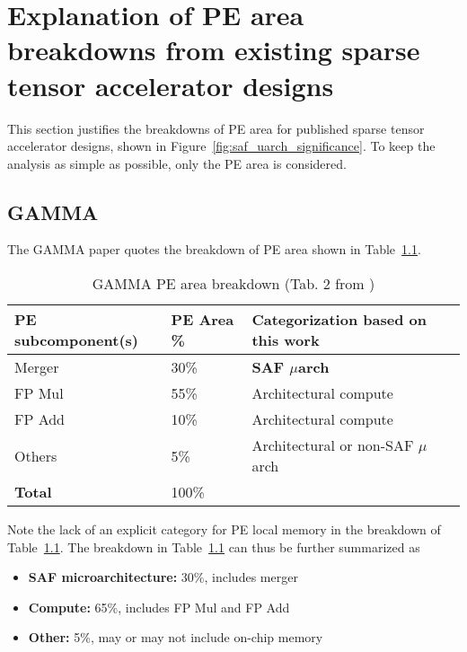 \chapter{Explanation of PE area breakdowns from existing sparse tensor accelerator designs}
\label{appendix:pe_breakdowns}

This section justifies the breakdowns of PE area for published sparse tensor accelerator designs, shown in Figure~\ref{fig:saf_uarch_significance}. To keep the analysis as simple as possible, only the PE area is considered.

\section{GAMMA\cite{gamma}}
\label{appendix:pe_breakdowns_gamma}

The GAMMA\cite{gamma} paper quotes the breakdown of PE area shown in Table~\ref{tab:gamma_pe_breakdown}.

\begin{table}
\caption{GAMMA PE area breakdown (Tab. 2 from \cite{gamma})}
\label{tab:gamma_pe_breakdown}
\begin{center}
\begin{tabular}{||l|l|l||}\hline
\textbf{PE subcomponent(s)} & \textbf{PE Area} \%  & \textbf{Categorization based on this work}  \\\hline
Merger	   & 30\% & \textbf{SAF $\mu$arch} \\\hline
FP Mul	   & 55\% & Architectural compute \\\hline
FP Add	   & 10\% & Architectural compute \\\hline
Others	   & 5\% & Architectural or non-SAF $\mu$arch \\\hline
\textbf{Total}	   & 100\% & \\\hline
\end{tabular}
\end{center}
\end{table}

Note the lack of an explicit category for PE local memory in the breakdown of Table~\ref{tab:gamma_pe_breakdown}. The breakdown in Table~\ref{tab:gamma_pe_breakdown} can thus be further summarized as

\begin{itemize}
    \item \textbf{SAF microarchitecture:} 30\%, includes merger
    \item \textbf{Compute:} 65\%, includes FP Mul and FP Add
    \item \textbf{Other:} 5\%, may or may not include on-chip memory
\end{itemize}

